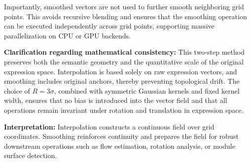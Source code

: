        Importantly, smoothed vectors are not used to further smooth neighboring grid points. This avoids recursive blending and ensures that the smoothing operation can be executed independently across grid points, supporting massive parallelization on CPU or GPU backends.

        \textbf{Clarification regarding mathematical consistency:} This two-step method preserves both the semantic geometry and the quantitative scale of the original expression space. Interpolation is based solely on raw expression vectors, and smoothing includes original anchors, thereby preventing topological drift. The choice of \( R = 3\sigma \), combined with symmetric Gaussian kernels and fixed kernel width, ensures that no bias is introduced into the vector field and that all operations remain invariant under rotation and translation in expression space.

        \textbf{Interpretation:} Interpolation constructs a continuous field over grid coordinates. Smoothing reinforces continuity and prepares the field for robust downstream operations such as flow estimation, rotation analysis, or module surface detection.